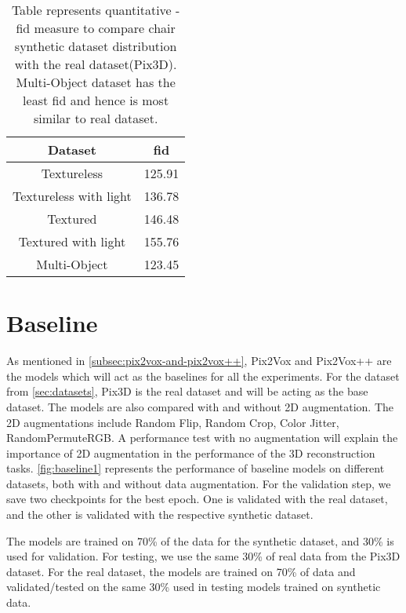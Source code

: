 \begin{table}[ht]
    \centering
    \begin{tabular}{|c |c |}
        \hline
        Dataset & \gls{fid} \\ [0.5ex]
        \hline\hline
        Textureless & 125.91 \\
        \hline
        Textureless with light & 136.78 \\
        \hline
        Textured  & 146.48 \\
        \hline
        Textured with light  & 155.76 \\
        \hline
        Multi-Object & 123.45 \\[1ex]
        \hline
    \end{tabular}
    \caption[\gls{fid} Comparison for Synthetic Chair Datasets with Real Dataset.]{Table represents quantitative - \gls{fid} measure to compare chair synthetic dataset distribution with the real dataset(Pix3D).
    Multi-Object dataset has the least \gls{fid} and hence is most similar to real dataset.}
    \label{tab:quantitative-dataset-comparison-chair-dataset}
\end{table}

\section{Baseline}\label{sec:baseline}

As mentioned in \autoref{subsec:pix2vox-and-pix2vox++}, Pix2Vox and Pix2Vox++ are the models which will act as the baselines for all the experiments.
For the dataset from \autoref{sec:datasets}, Pix3D is the real dataset and will be acting as the base dataset.
The models are also compared with and without 2D augmentation.
The 2D augmentations include Random Flip, Random Crop, Color Jitter, RandomPermuteRGB\@.
A performance test with no augmentation will explain the importance of 2D augmentation in the performance of the 3D reconstruction tasks.
\autoref{fig:baseline1} represents the performance of baseline models on different datasets, both with and without data augmentation.
For the validation step, we save two checkpoints for the best epoch.
One is validated with the real dataset, and the other is validated with the respective synthetic dataset.

The models are trained on 70\% of the data for the synthetic dataset, and 30\% is used for validation.
For testing, we use the same 30\% of real data from the Pix3D dataset.
For the real dataset, the models are trained on 70\% of data and validated/tested on the same 30\% used in testing models trained on synthetic data.

